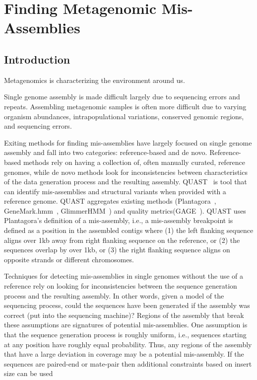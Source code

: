 \renewcommand{\thechapter}{5}

\chapter{Finding Metagenomic Mis-Assemblies}

\section{Introduction}
Metagenomics is characterizing the environment around us.

Single genome assembly is made difficult largely due to sequencing errors and repeats. Assembling metagenomic samples is often more difficult due to varying organism abundances, intrapopulational variations, conserved genomic regions, and sequencing errors.

Exiting methods for finding mis-assemblies have largely focused on single genome assembly and fall into two categories: reference-based and de novo.
Reference-based methods rely on having a collection of, often manually curated, reference genomes, while de novo methods look for inconsistencies between characteristics of the data generation process and the resulting assembly.
QUAST~\cite{gurevich2013quast} is tool that can identify mis-assemblies and structural variants when provided
with a reference genome.  QUAST aggregates existing methods (Plantagora~\cite{barthelson2011plantagora},
GeneMark.hmm~\cite{lukashin1998genemark}, GlimmerHMM~\cite{majoros2004tigrscan}) and quality metrics(GAGE~\cite{salzberg2011gage}). QUAST uses Plantagora’s definition of a mis-assembly,
i.e., a mis-assembly breakpoint is defined as a position in the assembled contigs where (1) the left flanking
sequence aligns over 1kb away from right flanking sequence on the reference, or (2) the sequences overlap by
over 1kb, or (3) the right flanking sequence aligns on opposite strands or different chromosomes.

Techniques for detecting mis-assemblies in single genomes without the use of a reference rely on looking for inconsistencies between the sequence generation process and the resulting assembly.  In other words, given a model of the sequencing process, could the sequences have been generated if the assembly was correct (put into the sequencing machine)? Regions of the assembly that break these assumptions are signatures of potential mis-assemblies.  One assumption is that the sequence generation process is roughly uniform, i.e., sequences starting at any position have roughly equal probability.  Thus, any regions of the assembly that have a large deviation in coverage may be a potential mis-assembly.  If the sequences are paired-end or mate-pair then additional constraints based on insert size can be used

